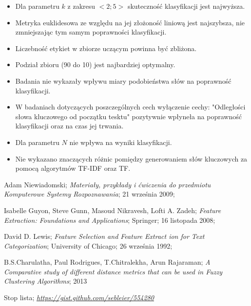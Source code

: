 \documentclass{classrep}
\begin{document}
\begin{itemize}
    \item Dla parametru $k$ z zakresu $<2;5>$ skuteczność klasyfikacji jest najwyższa.
    \item Metryka euklidesowa ze względu na jej złożoność liniową jest najszybsza, nie zmniejszając
            tym samym poprawności klasyfikacji.
    \item Liczebność etykiet w zbiorze uczącym powinna być zbliżona.
    \item Podział zbioru (90 do 10) jest najbardziej optymalny.
    \item Badania nie wykazały wpływu miary podobieństwa słów na poprawność klasyfikacji.
    \item W badaniach dotyczących poszczególnych cech wyłączenie cechy: "Odległości słowa kluczowego
        od początku tesktu" pozytywnie wpłyneła na poprawność klasyfikacji oraz na czas jej trwania.
    \item Dla parametru $N$ nie wpływa na wyniki klasyfikacji.
    \item Nie wykazano znaczących różnic pomiędzy generowaniem słów kluczowych za pomocą algorytmów TF-IDF oraz TF.
\end{itemize}


\begin{thebibliography}{0}

 Adam Niewiadomski;
\textsl{Materiały, przykłady i ćwiczenia do przedmiotu
Komputerowe Systemy Rozpoznawania}; 21 września 2009;

 Isabelle Guyon, Steve Gunn, Masoud Nikravesh, Lofti A. Zadeh;
\textsl{Feature Extraction: Foundations and Applications}; Springer; 16 listopada 2008;

 David D. Lewis;
\textsl{Feature Selection and Feature Extract ion for Text Categorization}; University of Chicago; 26 września 1992;

 B.S.Charulatha, Paul Rodrigues, T.Chitralekha, Arun Rajaraman;
\textsl{A Comparative study of different distance metrics that can be used in Fuzzy Clustering Algorithms}; 2013

 Stop lista;
\textsl{\url{https://gist.github.com/sebleier/554280}}

\end{thebibliography}
\end{document}
